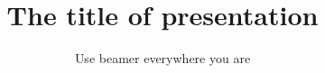 \documentclass[10pt,pdf,hyperref={unicode}]{beamer}
\title{The title of presentation}
\subtitle{Use beamer everywhere you are}
\begin{document}
\begin{frame}

\end{frame} 

\begin{frame}
\end{frame}
\end{document}
